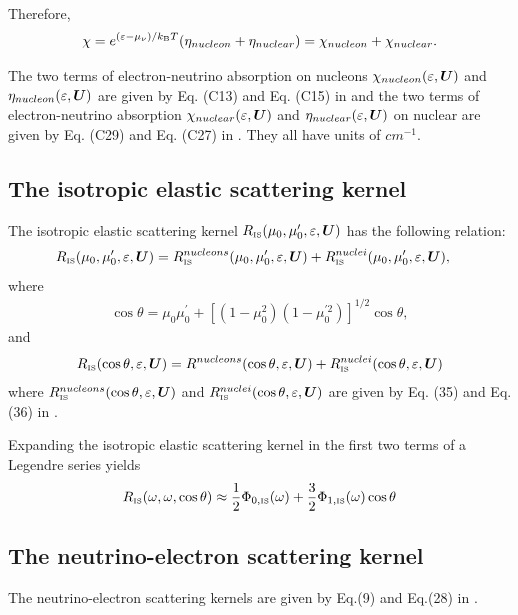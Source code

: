 \documentclass[10pt,preprint]{aastex}
\begin{document}
Therefore,
\begin{equation}
\chi = e^{(\varepsilon-\mu_{\nu})/k_{\mbox{\tiny B}}T} (\eta_{nucleon} + \eta_{nuclear} ) = \chi_{nucleon} + \chi_{nuclear}.
\end{equation}

The two terms of electron-neutrino absorption on nucleons $\chi_{nucleon}(\varepsilon,\boldsymbol{U})$ and $\eta_{nucleon}(\varepsilon,\boldsymbol{U})$ are given by Eq. (C13) and Eq. (C15) in \citet{bruenn_1985}  and the two terms of electron-neutrino absorption $\chi_{nuclear}(\varepsilon,\boldsymbol{U})$ and $\eta_{nuclear}(\varepsilon,\boldsymbol{U})$ on nuclear are given by Eq. (C29) and Eq. (C27) in \citet{bruenn_1985}. They all have units of $cm^{-1}$.

\subsection{The isotropic elastic scattering kernel}
The isotropic elastic scattering kernel $R_{\mbox{\tiny IS}}(\mu_0, \mu^\prime_0, \varepsilon,\boldsymbol{U})$ has the following relation:
\begin{align}
R_{\mbox{\tiny IS}}(\mu_0, \mu^\prime_0, \varepsilon,\boldsymbol{U}) & = R_{\mbox{\tiny IS}}^{nucleons}(\mu_0, \mu^\prime_0, \varepsilon,\boldsymbol{U}) +  R_{\mbox{\tiny IS}}^{nuclei}(\mu_0, \mu^\prime_0, \varepsilon,\boldsymbol{U}),
\end{align}
where
\begin{align}
\cos\theta = \mu_0\mu^\prime_0 + [(1-\mu_0^2)(1-\mu_0^{\prime 2})]^{1/2}\cos\theta,
\end{align}
and
\begin{align}
R_{\mbox{\tiny IS}}(\cos\theta, \varepsilon, \boldsymbol{U}) = R^{nucleons}(\cos\theta,\varepsilon, \boldsymbol{U}) + R^{nuclei}_{\mbox{\tiny IS}}(\cos\theta, \varepsilon, \boldsymbol{U})
\end{align}
where $R^{nucleons}_{\mbox{\tiny IS}} (\cos\theta,\varepsilon, \boldsymbol{U})$ and $R^{nuclei}_{\mbox{\tiny IS}}(\cos\theta,\varepsilon,\boldsymbol{U})$ are given by Eq. (35) and Eq. (36) in \citet{mezzacappaBruenn_1993a}.

Expanding the isotropic elastic scattering kernel in the first two terms of a Legendre series yields
\begin{align}
R_{\mbox{\tiny IS}}(\omega, \omega, \cos\theta) \approx \dfrac{1}{2} \Phi_{0,\mbox{\tiny IS}}(\omega) + \dfrac{3}{2}\Phi_{1,\mbox{\tiny IS}}(\omega)\cos\theta
\end{align}

\subsection{The neutrino-electron scattering kernel}
The neutrino-electron scattering kernels are given by Eq.(9) and Eq.(28) in \citet{mezzacappaBruenn_1993c}.
\end{document}

